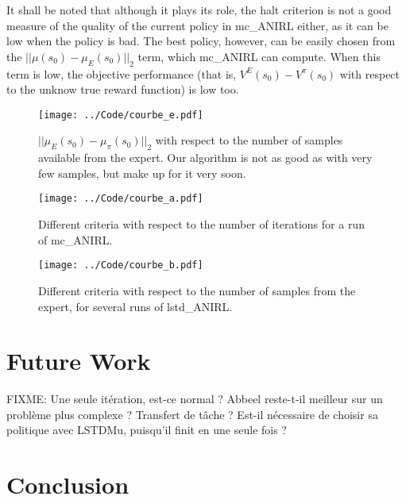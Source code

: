 \documentclass{article}
\begin{document}
It shall be noted that although it plays its role, the halt criterion is not a good measure of the quality of the current policy in mc\_ANIRL either, as it can be low when the policy is bad. The best policy, however, can be easily chosen from the $||\mu(s_0) - \mu_E(s_0)||_2$ term, which mc\_ANIRL can compute. When this term is low, the objective performance (that is, $V^E(s_0)-V^\pi(s_0)$ with respect to the unknow true reward function) is low too. 
\begin{figure}
\texttt{[image: ../Code/courbe\_e.pdf]}
\caption{$||\mu_E(s_0)-\mu_\pi(s_0)||_2$ with respect to the number of samples available from the expert. Our algorithm is not as good as \citet{abbeel2004apprenticeship} with very few samples, but make up for it very soon.}
\label{fig:E}
\end{figure}
\label{sec:perf}
\begin{figure}
\texttt{[image: ../Code/courbe\_a.pdf]}
\caption{Different criteria with respect to the number of iterations for a run of mc\_ANIRL.}
\label{fig:A}
\end{figure}
\begin{figure}
\texttt{[image: ../Code/courbe\_b.pdf]}
\caption{Different criteria with respect to the number of samples from the expert, for several runs of lstd\_ANIRL.}
\label{fig:B}
\end{figure}
\section{Future Work}
FIXME: Une seule itération, est-ce normal ? Abbeel reste-t-il meilleur sur un problème plus complexe ? Transfert de tâche ? Est-il nécessaire de choisir sa politique avec LSTDMu, puisqu'il finit en une seule fois ?
\section{Conclusion}


\end{document}
